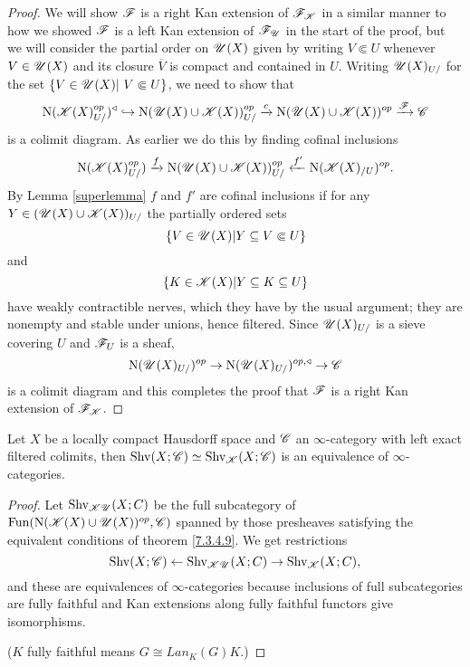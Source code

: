 \documentclass[../../thesis.tex]{subfiles}
\begin{document}
\begin{proof}
    We will show $\mathscr{F}$ is a right Kan extension of $\mathscr{F}_{\mathscr{K}}$ in a similar manner to how we showed $\mathscr{F}$ is a left Kan extension of $\mathscr{F}_{\mathscr{U}}$ in the start of the proof, but we will consider the partial order on $\mathscr{U}(X)$ given by writing $V\Subset U$ whenever $V\in \mathscr{U}(X)$ and its closure $\overline{V}$ is compact and contained in $U$.
    Writing $\mathscr{U}(X)_{U/}$ for the set $\{V\in \Open(X) | V\Subset U\}$, we need to show that
    \[
        \mathrm{N}(\mathscr{K}(X)_{U/}^{op})^{\triangleleft} \hookrightarrow \mathrm{N}(\mathscr{U}(X) \cup \mathscr{K}(X))_{U/}^{op} \xrightarrow{c}\mathrm{N}(\mathscr{U}(X) \cup \mathscr{K}(X))^{op} \xrightarrow{\mathscr{F}} \mathscr{C}
    \]
    is a colimit diagram.
    As earlier we do this by finding cofinal inclusions
    \[
        \mathrm{N}(\mathscr{K}(X)_{U/}^{op}) \xrightarrow{f}\mathrm{N}(\mathscr{U}(X) \cup \mathscr{K}(X))_{U/}^{op} \xleftarrow{f'} \mathrm{N}(\mathscr{K}(X)_{/U})^{op}.
    \]
    By Lemma \ref{superlemma} $f$ and $f'$ are cofinal inclusions if for any $Y\in (\mathscr{U}(X) \cup \mathscr{K}(X))_{U/}$ the partially ordered sets
    \[
        \{ V \in \mathscr{U}(X) |Y \subseteq V \Subset U \}
    \]
    and
    \[
        \{ K \in \mathscr{K}(X) |Y \subseteq K \subseteq U \}
    \]
    have weakly contractible nerves, which they have by the usual argument; they are nonempty and stable under unions, hence filtered.
    Since $\mathscr{U}(X)_{U/}$ is a sieve covering $U$ and $\mathscr{F}_U$ is a sheaf,
    \[
        \mathrm{N}(\mathscr{U}(X)_{U/})^{op} \to \mathrm{N}(\mathscr{U}(X)_{U/})^{op, \triangleleft} \to \mathscr{C}
    \]
    is a colimit diagram and this completes the proof that $\mathscr{F}$ is a right Kan extension of $\mathscr{F}_{\mathscr{K}}$.
\end{proof}
\begin{corollary}\label{7.3.4.10}
    Let $X$ be a locally compact Hausdorff space and $\mathscr{C}$ an $\infty$-category with left exact filtered colimits, then $\mathrm{Shv}(X;\mathscr{C}) \simeq \mathrm{Shv}_{\mathscr{K}}(X;\mathscr{C})$ is an equivalence of $\infty$-categories.
\end{corollary}
\begin{proof}
    Let $\mathrm{Shv}_{\mathscr{K}\mathscr{U}}(X;C)$ be the full subcategory of $\mathrm{Fun}(\mathrm{N}(\mathscr{K}(X)\cup \mathscr{U}(X))^{op},\mathscr{C})$ spanned by those presheaves satisfying the equivalent conditions of theorem \ref{7.3.4.9}. We get restrictions
    \[
        \mathrm{Shv}(X;\mathscr{C}) \leftarrow \mathrm{Shv}_{\mathscr{K}\mathscr{U}}(X;C) \to \mathrm{Shv}_{\mathscr{K}}(X;C),
    \]
    and these are equivalences of $\infty$-categories because inclusions of full subcategories are fully faithful and Kan extensions along fully faithful functors give isomorphisms.

    ($K$ fully faithful means $G \cong Lan_K(G)K$.)
\end{proof}
\end{document}
